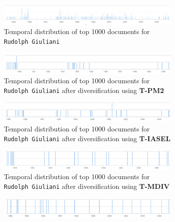 \begin{figure}
  \centering
  \begin{subfigure}[b]{0.95\textwidth}
    \includegraphics[width=\textwidth]{images/rg_timeline.png}
    \caption{Temporal distribution of top 1000 documents for \texttt{Rudolph Giuliani}}
    \label{fig:temporal_rg}
  \end{subfigure}%
  \begin{subfigure}[b]{1.0\textwidth}
          \includegraphics[width=\textwidth]{images/rg_timeline_pm230.png}
          \caption{Temporal distribution of top 1000 documents for \texttt{Rudolph Giuliani} after diversification using \textbf{T-PM2}}
          \label{fig:temporal_rg}
  \end{subfigure}%
  \begin{subfigure}[b]{1.0\textwidth}
          \includegraphics[width=\textwidth]{images/rg_timeline_iasel30.png}
          \caption{Temporal distribution of top 1000 documents for \texttt{Rudolph Giuliani} after diversification using \textbf{T-IASEL}}
          \label{fig:temporal_rg}
  \end{subfigure}%
  \begin{subfigure}[b]{1.0\textwidth}
          \includegraphics[width=\textwidth]{images/rg_timeline_mdiv30.png}
          \caption{Temporal distribution of top 1000 documents for \texttt{Rudolph Giuliani} after diversification using \textbf{T-MDIV}}
          \label{fig:temporal_rg}
  \end{subfigure}%
  \begin{subfigure}[b]{1.0\textwidth}
          \includegraphics[width=\textwidth]{images/rg_timeline_lmtd30.png}

\end{subfigure}
\end{figure}
